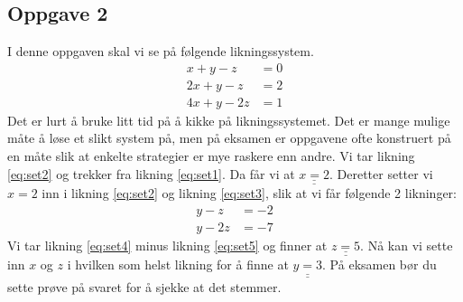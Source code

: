 \documentclass[12pt, a4paper]
{article}						%
\def\answer#1{\underline{\underline{#1}}}
\begin{document}
\subsection*{Oppgave 2}
I denne oppgaven skal vi se på følgende likningssystem.
\begin{align}
	\label{eq:set1} x + y -z &= 0 \\
	\label{eq:set2} 2x + y -z &= 2 \\
	\label{eq:set3} 4x + y -2z &= 1 
\end{align}
Det er lurt å bruke litt tid på å kikke på likningssystemet. Det er mange mulige måte å løse 
et slikt system på, men på eksamen er oppgavene ofte konstruert på en måte slik at enkelte
strategier er mye raskere enn andre.
Vi tar likning \eqref{eq:set2} og trekker fra likning \eqref{eq:set1}. Da får vi at $\answer{x = 2}$.
Deretter setter vi $x = 2$ inn i likning \eqref{eq:set2} og likning \eqref{eq:set3}, slik at vi får følgende 2 likninger:
\begin{align}
\label{eq:set4}  y -z &= -2 \\
\label{eq:set5} y -2z &= -7
\end{align}
Vi tar likning \eqref{eq:set4} minus likning \eqref{eq:set5} og finner at $\answer{z = 5}$. 
Nå kan vi sette inn $x$ og $z$ i hvilken som helst likning for å finne at $\answer{y = 3}$.
På eksamen bør du sette prøve på svaret for å sjekke at det stemmer.
\end{document}
